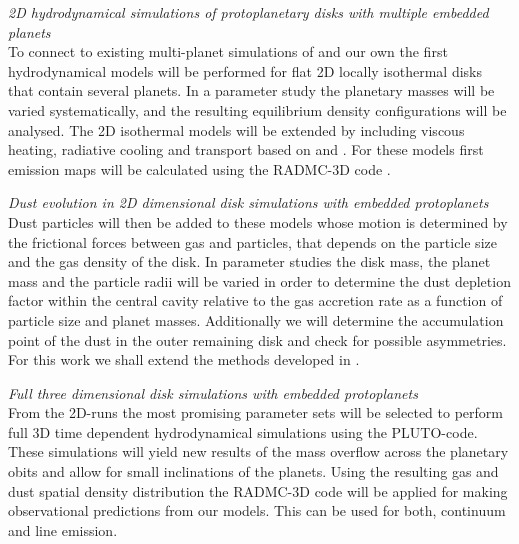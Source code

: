 \documentclass[10pt,fleqn,twoside]{article}
\begin{document}
\begin{compactenumerate}
 \item {\it 2D hydrodynamical simulations of protoplanetary disks with multiple embedded planets} \\ 
To connect to existing multi-planet simulations of \citet{2011ApJ...729...47Z} 
   and our own \citep{2013A&A...560A..40M}
   the first hydrodynamical models will be performed for flat 2D locally isothermal disks that
   contain several planets. In a parameter study the planetary masses will be varied systematically,
   and the resulting equilibrium density configurations will be analysed. The 2D isothermal models will
   be extended by including viscous heating, radiative cooling and transport based on \citet{2008A&A...487L...9K} and \citet{2012A&A...539A..18M}. 
  For these models first emission maps will be calculated using the RADMC-3D code \citep{2012ascl.soft02015D}.
\item {\it Dust evolution in 2D dimensional disk simulations with embedded protoplanets} \\
   Dust particles will then be added to these models whose motion is determined by the frictional forces between
   gas and particles, that depends on the particle size and the gas density of the disk. 
   In parameter studies the disk mass, the planet mass and the particle radii will be varied in order to
   determine the dust depletion factor within the central cavity relative to the gas accretion rate 
   as a function of particle size and planet masses. Additionally we will determine the accumulation point of the dust
   in the outer remaining disk and check for possible asymmetries.
   For this work we shall extend the methods developed in \citet{2015A&A...584A.110P}.
\item {\it Full three dimensional disk simulations with embedded protoplanets} \\
   From the 2D-runs the most promising parameter sets will be selected to perform full 3D time dependent
   hydrodynamical simulations using the {PLUTO}-code. These simulations will yield new results of the
   mass overflow across the planetary obits and allow for small inclinations of the planets.
   Using the resulting gas and dust spatial density distribution
   the RADMC-3D code will be applied for making observational predictions from our models.
   This can be used for both, continuum and line emission.
\end{compactenumerate}
\end{document}
